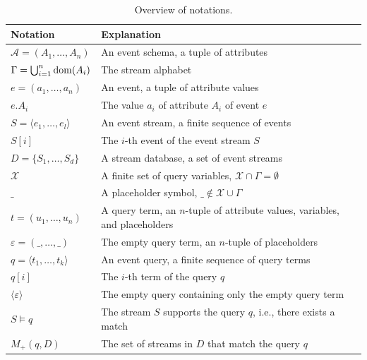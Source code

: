 \begin{table}[t]
	\caption{Overview of notations.}
	\label{tab:notations}
	\vspace{-.5em}
	\footnotesize
	\begin{tabularx} {\textwidth}{l
	 @{\hspace{.5em}} p{10cm}}
	\toprule
	Notation & Explanation \\
	\midrule
	$\mathcal{A}=(A_1, \ldots, A_n )$ & An event
	schema, a
	tuple of attributes\\
	$\Gamma  = \bigcup_{i=1}^n{\operatorname{dom}(A_i)}$ & The stream alphabet\\
	$e= (a_1, \ldots, a_n)$ & An event, a tuple
	of attribute values\\
	$e.A_i$ & The value $a_i$ of attribute $A_i$ of
	event $e$\\
	$S=\langle e_1, \ldots, e_l \rangle$ & An event
	stream, a finite sequence of events\\
	$S[i]$ & The $i$-th event of the event stream $S$\\
	$D=\{S_1,\ldots, S_d \}$ & A stream database, a
	set of event streams\\
	\midrule
	$\mathcal{X}$ & A finite set of query variables, $\mathcal{X} \cap
	\Gamma=\emptyset$\\
	$\_$ & A placeholder symbol, $\_ \notin \mathcal{X}\cup
	\Gamma$\\
	$t=(u_{1},\ldots,u_{n})$& A query term, an
	$n$-tuple of attribute values, variables, and placeholders\\
	$\varepsilon=(\_,\ldots,\_)$& The empty query term, an
$n$-tuple of placeholders\\
	$q=\langle
	t_1, \ldots, t_k \rangle$ & An event query, a finite sequence of
	query terms \\
	$q[i]$ & The $i$-th term of the query $q$\\
	$\langle \varepsilon\rangle$ & The empty query containing only the empty
	query term \\
	\midrule
	$S \models q$ & The stream $S$ supports the
	query $q$, i.e., there exists a match\\
	$M_+(q,D)$ & The set of streams in $D$ that match the query $q$\\

\end{tabularx}
\end{table}
